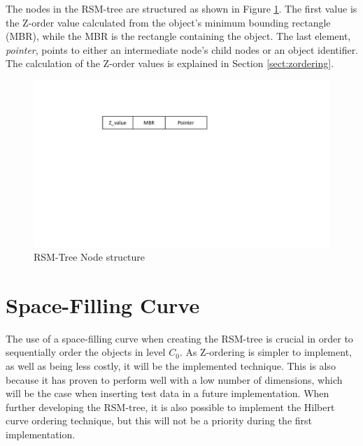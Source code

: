 \noindent
The nodes in the RSM-tree are structured as shown in Figure \ref{fig:nodeRSM}. The first value is the Z-order value calculated from the object's minimum bounding rectangle (MBR), while the MBR is the rectangle containing the object. The last element, \emph{pointer}, points to either an intermediate node's child nodes or an object identifier. The calculation of the Z-order values is explained in Section \ref{sect:zordering}. 

\begin{figure}[ht]
    \centering
    \includegraphics[scale=0.5]{figures/node_RSM.pdf}
    \caption{RSM-Tree Node structure}
    \label{fig:nodeRSM}
\end{figure}

\section{Space-Filling Curve}
\label{sect:ordering}
The use of a space-filling curve when creating the RSM-tree is crucial in order to sequentially order the objects in level $C_0$. As Z-ordering is simpler to implement, as well as being less costly, it will be the implemented technique. This is also because it has proven to perform well with a low number of dimensions\cite{IrregularSpace}, which will be the case when inserting test data in a future implementation. When further developing the RSM-tree, it is also possible to implement the Hilbert curve ordering technique, but this will not be a priority during the first implementation. 

